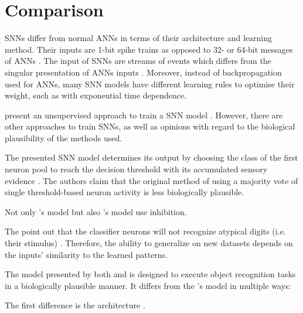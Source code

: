 \section{Comparison}
\label{sec:comparison}

\acp{SNN} differ from normal \acp{ANN} in terms of their architecture and learning method.
Their inputs are 1-bit spike trains as opposed to 32- or 64-bit messages of \acp{ANN} \cite{SNN}.
The input of \acp{SNN} are streams of events which differs from the singular presentation of \acp{ANN} inputs \cite{ANN_SNN_conversion}.
Moreover, instead of backpropagation used for \acp{ANN}, many \ac{SNN} models have different learning rules to optimise their weight, 
such as  with exponential time dependence.

\authorsSNN{} present an unsupervised approach to train a \ac{SNN} model \cite{SNN}.
However, there are other approaches to train \acp{SNN}, as well as opinions with regard to the biological plausibility of the methods used.


The presented \ac{SNN} model determines its output by 
choosing the class of the first neuron pool to reach the decision threshold with its accumulated sensory evidence \cite{STDP_like}.
The authors claim that the original method of using a majority vote of single threshold-based neuron activity is less biologically plausible.

Not only \authorsSTDPlike{}'s model \cite{STDP_like} but also \authorsSNN{}'s model \cite{SNN} use inhibition.

The \authorsSTDPlike{} point out that the classifier neurons will not recognize atypical digits (i.e. their stimulus) \cite{STDP_like}.
Therefore, the ability to generalize on new datasets depends on the inputs' similarity to the learned patterns.


The model presented by both \authorsmultiScaleSTDP{} \cite{multi_scale_STDP} and \authorsSTDPvisFeat{} \cite{STDP_vis_feat} 
is designed to execute object recognition tasks in a biologically plausible manner.
It differs from the \authorsSNN{}'s model \cite{SNN} in multiple ways:

The first difference is the architecture \cite{multi_scale_STDP,STDP_vis_feat}.

